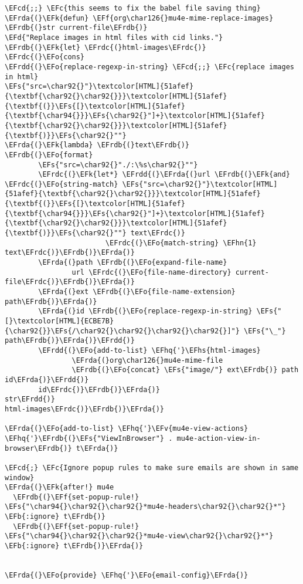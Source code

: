\documentclass[a4wide,10pt]{article}
\newcommand{\EFc}[1]{\textcolor{EFc}{#1}} %
\newcommand{\EFcd}[1]{\textcolor{EFcd}{#1}} %
\newcommand{\EFs}[1]{\textcolor{EFs}{#1}} %
\newcommand{\EFd}[1]{\textcolor{EFd}{#1}} %
\newcommand{\EFk}[1]{\textcolor{EFk}{#1}} %
\newcommand{\EFb}[1]{\textcolor{EFb}{#1}} %
\newcommand{\EFf}[1]{\textcolor{EFf}{#1}} %
\newcommand{\EFv}[1]{\textcolor{EFv}{#1}} %
\newcommand{\EFo}[1]{\textcolor{EFo}{#1}} %
\newcommand{\EFhn}[1]{\textcolor{EFhn}{\textbf{#1}}} %
\newcommand{\EFhq}[1]{\textcolor{EFhq}{#1}} %
\newcommand{\EFhs}[1]{\textcolor{EFhs}{#1}} %
\newcommand{\EFrda}[1]{\textcolor{EFrda}{#1}} %
\newcommand{\EFrdb}[1]{\textcolor{EFrdb}{#1}} %
\newcommand{\EFrdc}[1]{\textcolor{EFrdc}{#1}} %
\newcommand{\EFrdd}[1]{\textcolor{EFrdd}{#1}} %
\begin{document}
\begin{Code}
\begin{Verbatim}
\EFcd{;;} \EFc{this seems to fix the babel file saving thing}
\EFrda{(}\EFk{defun} \EFf{org\char126{}mu4e-mime-replace-images} \EFrdb{(}str current-file\EFrdb{)}
\EFd{"Replace images in html files with cid links."}
\EFrdb{(}\EFk{let} \EFrdc{(}html-images\EFrdc{)}
\EFrdc{(}\EFo{cons}
\EFrdd{(}\EFo{replace-regexp-in-string} \EFcd{;;} \EFc{replace images in html}
\EFs{"src=\char92{}"}\textcolor[HTML]{51afef}{\textbf{\char92{}\char92{}}}\textcolor[HTML]{51afef}{\textbf{(}}\EFs{[}\textcolor[HTML]{51afef}{\textbf{\char94{}}}\EFs{\char92{}"]+}\textcolor[HTML]{51afef}{\textbf{\char92{}\char92{}}}\textcolor[HTML]{51afef}{\textbf{)}}\EFs{\char92{}""}
\EFrda{(}\EFk{lambda} \EFrdb{(}text\EFrdb{)}
\EFrdb{(}\EFo{format}
        \EFs{"src=\char92{}"./:\%s\char92{}""}
        \EFrdc{(}\EFk{let*} \EFrdd{(}\EFrda{(}url \EFrdb{(}\EFk{and} \EFrdc{(}\EFo{string-match} \EFs{"src=\char92{}"}\textcolor[HTML]{51afef}{\textbf{\char92{}\char92{}}}\textcolor[HTML]{51afef}{\textbf{(}}\EFs{[}\textcolor[HTML]{51afef}{\textbf{\char94{}}}\EFs{\char92{}"]+}\textcolor[HTML]{51afef}{\textbf{\char92{}\char92{}}}\textcolor[HTML]{51afef}{\textbf{)}}\EFs{\char92{}""} text\EFrdc{)}
                        \EFrdc{(}\EFo{match-string} \EFhn{1} text\EFrdc{)}\EFrdb{)}\EFrda{)}
        \EFrda{(}path \EFrdb{(}\EFo{expand-file-name}
                url \EFrdc{(}\EFo{file-name-directory} current-file\EFrdc{)}\EFrdb{)}\EFrda{)}
        \EFrda{(}ext \EFrdb{(}\EFo{file-name-extension} path\EFrdb{)}\EFrda{)}
        \EFrda{(}id \EFrdb{(}\EFo{replace-regexp-in-string} \EFs{"[}\textcolor[HTML]{ECBE7B}{\char92{}}\EFs{/\char92{}\char92{}\char92{}\char92{}]"} \EFs{"\_"} path\EFrdb{)}\EFrda{)}\EFrdd{)}
        \EFrdd{(}\EFo{add-to-list} \EFhq{'}\EFhs{html-images}
                \EFrda{(}org\char126{}mu4e-mime-file
                \EFrdb{(}\EFo{concat} \EFs{"image/"} ext\EFrdb{)} path id\EFrda{)}\EFrdd{)}
        id\EFrdc{)}\EFrdb{)}\EFrda{)}
str\EFrdd{)}
html-images\EFrdc{)}\EFrdb{)}\EFrda{)}

\EFrda{(}\EFo{add-to-list} \EFhq{'}\EFv{mu4e-view-actions}
\EFhq{'}\EFrdb{(}\EFs{"ViewInBrowser"} . mu4e-action-view-in-browser\EFrdb{)} t\EFrda{)}

\EFcd{;} \EFc{Ignore popup rules to make sure emails are shown in same window}
\EFrda{(}\EFk{after!} mu4e
  \EFrdb{(}\EFf{set-popup-rule!} \EFs{"\char94{}\char92{}\char92{}*mu4e-headers\char92{}\char92{}*"} \EFb{:ignore} t\EFrdb{)}
  \EFrdb{(}\EFf{set-popup-rule!} \EFs{"\char94{}\char92{}\char92{}*mu4e-view\char92{}\char92{}*"} \EFb{:ignore} t\EFrdb{)}\EFrda{)}


\EFrda{(}\EFo{provide} \EFhq{'}\EFo{email-config}\EFrda{)}
\end{Verbatim}
\end{Code}
\end{document}
